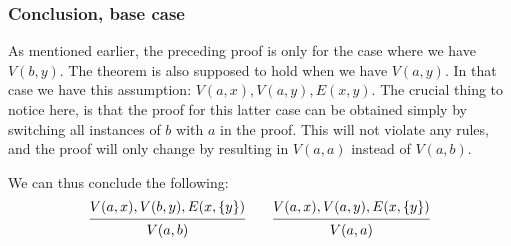 \subsubsection{Conclusion, base case}
\label{subs:Conclusion, base case}
As mentioned earlier, the preceding proof is only for the case where we have $V(b,y)$.
The theorem is also supposed to hold when we have $V(a,y)$.
In that case we have this assumption: $V(a,x),V(a,y),E(x,{y})$.
The crucial thing to notice here, is that the proof for this latter case can be obtained simply by switching all instances of $b$ with $a$ in the proof.
This will not violate any rules, and the proof will only change by resulting in $V(a,a)$ instead of $V(a,b)$.

We can thus conclude the following:
\[
\begin{prooftree}
  \Hypo{V(a,x),V(b,y),E(x,\{y\})}
  \Infer1{V(a,b)}
\end{prooftree}
\quad\quad
\begin{prooftree}
  \Hypo{V(a,x),V(a,y),E(x,\{y\})}
  \Infer1{V(a,a)}
\end{prooftree}
\]
